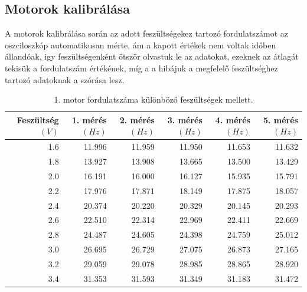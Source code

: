 \documentclass[10pt,pdftex]{report}
\begin{document}
\subsection*{Motorok kalibrálása}
A motorok kalibrálása során az adott feszültségekez tartozó fordulatszámot az oszciloszkóp automatikusan mérte, ám a kapott értékek nem voltak időben állandóak, igy 
feszültségenként ötször olvastuk le az adatokat, ezeknek az átlagát tekisük a fordulatszám értékének, míg a a hibájuk a megfelelő feszültséghez tartozó adatoknak a szórása lesz.\\
\begin{table}[H]
    \begin{tabular}{|r|r|r|r|r|r|}
        \hline
        Feszültség$(V)$ & 1. mérés$(Hz)$ & 2. mérés$(Hz)$ & 3. mérés$(Hz)$ & 4. mérés$(Hz)$ & 5. mérés$(Hz)$ \\
        \hline
        1.6 & 11.996 & 11.959 & 11.950 & 11.653 & 11.632 \\
        \hline
        1.8 & 13.927 & 13.908 & 13.665 & 13.500 & 13.429 \\
        \hline
        2.0 & 16.191 & 16.000 & 16.127 & 15.935 & 15.791 \\
        \hline
        2.2 & 17.976 & 17.871 & 18.149 & 17.875 & 18.057 \\
        \hline
        2.4 & 20.374 & 20.220 & 20.329 & 20.145 & 20.293 \\
        \hline
        2.6 & 22.510 & 22.314 & 22.969 & 22.411 & 22.669 \\
        \hline
        2.8 & 24.487 & 24.605 & 24.398 & 24.759 & 25.012 \\
        \hline
        3.0 & 26.695 & 26.729 & 27.075 & 26.873 & 27.165 \\
        \hline
        3.2 & 29.059 & 29.078 & 28.985 & 28.865 & 28.920 \\
        \hline
        3.4 & 31.353 & 31.593 & 31.349 & 31.183 & 31.472 \\
        \hline
    \end{tabular}
    \caption{1. motor fordulatszáma különböző feszültségek mellett.}
\end{table}
\end{document}
